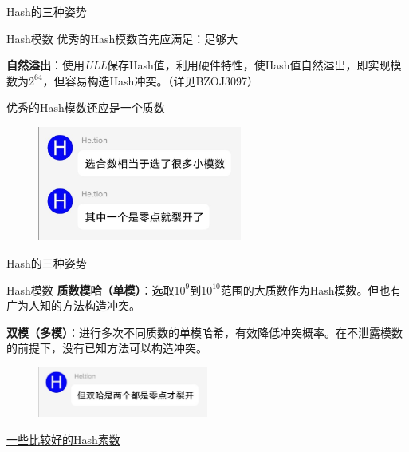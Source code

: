 \documentclass{ctexbeamer}		%
\begin{document}
\begin{frame}{Hash的三种姿势}
\begin{block}{Hash模数}
优秀的Hash模数首先应满足：{\color{red}足够大}

\pause

\textbf{自然溢出}：使用\textit{ULL}保存Hash值，利用硬件特性，使Hash值自然溢出，即实现模数为$2^{64}$，但容易构造Hash冲突。（详见BZOJ3097）

\pause
\hphantom{}

优秀的Hash模数还应是一个{\color{red}质数}

\begin{figure}
    \centering
    \includegraphics[width=0.6\textwidth]{./1.jpg}
    \label{fig:my_label}
\end{figure}

\end{block}
\end{frame}
\begin{frame}{Hash的三种姿势}
\begin{block}{Hash模数}
\textbf{质数模哈（单模）}：选取$10^9$到$10^{10}$范围的大质数作为Hash模数。但也有广为人知的方法构造冲突。

\pause
\hphantom{}

\textbf{双模（多模）}：进行多次不同质数的单模哈希，有效降低冲突概率。在不泄露模数的前提下，没有已知方法可以构造冲突。

\pause

\begin{figure}
    \centering
    \includegraphics[width=0.5\textwidth]{./2.jpg}
    \label{fig:my_label}
\end{figure}

\hphantom{}

\href{https://planetmath.org/goodhashtableprimes}{\color{blue}一些比较好的Hash素数}
\end{block}
\end{frame}
\end{document}
